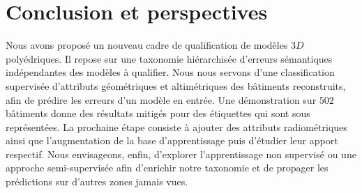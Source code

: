 \documentclass[a4paper,french]{article}
\begin{document}
    \section{Conclusion et perspectives}

    Nous avons proposé un nouveau cadre de qualification de modèles $3D$ polyédriques. Il repose sur une taxonomie hiérarchisée d'erreurs sémantiques indépendantes des modèles à qualifier. Nous nous servons d'une classification supervisée d'attributs géométriques et altimétriques des bâtiments reconstruits, afin de prédire les erreurs d'un modèle en entrée. Une démonstration sur $502$ bâtiments donne des résultats mitigés pour des étiquettes qui sont sous représentées. La prochaine étape consiste à ajouter des attributs radiométriques ainsi que l'augmentation de la base d'apprentissage puis d'étudier leur apport respectif. Nous envisageons, enfin, d'explorer l'apprentissage non supervisé ou une approche semi-supervisée afin d'enrichir notre taxonomie et de propager les prédictions sur d'autres zones jamais vues.

    
    
\end{document}
